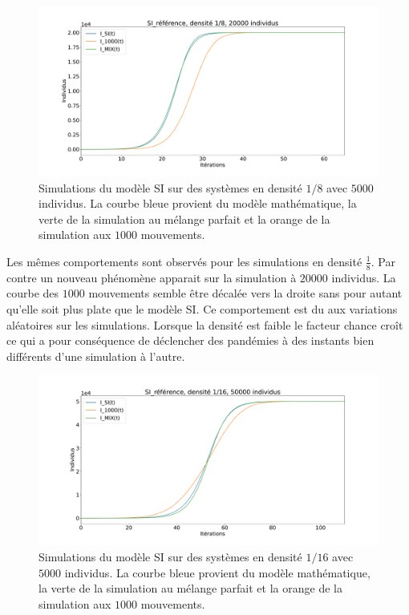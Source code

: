 \begin{figure}[h]
	\centering
	\captionsetup{justification=centering}
	\includegraphics[width=1\textwidth]{Images/SI_ref_8_20k.pdf}
	\caption[Simulations de SI, densité 1/8]{Simulations du modèle SI sur des systèmes en densité $1/8$ avec $5000$ individus. La courbe bleue provient du modèle mathématique, la verte de la simulation au mélange parfait et la orange de la simulation aux $1000$ mouvements.}
\end{figure}

Les mêmes comportements sont observés pour les simulations en densité $\frac{1}{8}$. Par contre un nouveau phénomène apparait sur la simulation à $20000$ individus. La courbe des $1000$ mouvements semble être décalée vers la droite sans pour autant qu'elle soit plus plate que le modèle SI. Ce comportement est du aux variations aléatoires sur les simulations. Lorsque la densité est faible le facteur chance croît ce qui a pour conséquence de déclencher des pandémies à des instants bien différents d'une simulation à l'autre.

\begin{figure}[h]
	\centering
	\captionsetup{justification=centering}
	\includegraphics[width=1\textwidth]{Images/SI_ref_16_50k.pdf}
	\caption[Simulations de SI, densité 1/16]{Simulations du modèle SI sur des systèmes en densité $1/16$ avec $5000$ individus. La courbe bleue provient du modèle mathématique, la verte de la simulation au mélange parfait et la orange de la simulation aux $1000$ mouvements.}
\end{figure}

